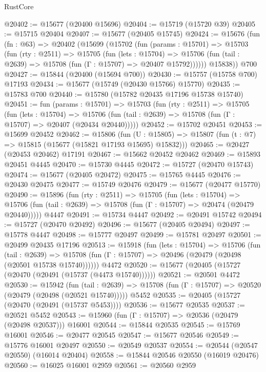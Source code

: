 \begin{lexlean}{RustCore}
\begin{coremodule}
@20402 := @15677 (@20400 @15696)
@20404 := @15719 (@15720 @39)
@20405 := @15715 @20404
@20407 := @15677 (@20405 @15745)
@20424 := @15676
    (fun (fn : @63) =>
    @20402
      (@15699
        (@15702
          (fun (params : @15701) =>
          @15703
            (fun (rty : @2511) =>
            @15705
              (fun (lets : @15704) =>
              @15706 (fun (tail : @2639) => @15708 (fun (Γ : @15707) => @20407 @15792))))))
        @15838))
    @700
@20427 := @15844 (@20400 (@15694 @700))
@20430 := @15757 (@15758 @700) @17193
@20434 := @15677 (@15749 (@20430 @15766) @15770)
@20435 := @15783 @700
@20440 := @15780 (@15782 @20435 @17196 @15738 @15740)
@20451 := fun (params : @15701) =>
  @15703
    (fun (rty : @2511) =>
    @15705
      (fun (lets : @15704) =>
      @15706 (fun (tail : @2639) => @15708 (fun (Γ : @15707) => @20407 (@20434 @20440)))))
@20452 := @15702 @20451
@20453 := @15699 @20452
@20462 := @15806
    (fun (U : @15805) => @15807 (fun (t : @7) => @15815 (@15677 (@15821 @17193 @15695) @15832)))
@20465 := @20427 (@20453 @20462) @17191
@20467 := @15662 @20452 @20462
@20469 := @15893 @20451 @4445
@20470 := @15730 @4445
@20472 := @15727 (@20470 @15743)
@20474 := @15677 (@20405 @20472)
@20475 := @15765 @4445
@20476 := @20430 @20475
@20477 := @15749 @20476
@20479 := @15677 (@20477 @15770)
@20490 := @15896
    (fun (rty : @2511) =>
    @15705
      (fun (lets : @15704) =>
      @15706 (fun (tail : @2639) => @15708 (fun (Γ : @15707) => @20474 (@20479 @20440)))))
    @4447
@20491 := @15734 @4447
@20492 := @20491 @15742
@20494 := @15727 (@20470 @20492)
@20496 := @15677 (@20405 @20494)
@20497 := @15778 @4447
@20498 := @15777 @20497
@20499 := @15781 @20497
@20501 := @20499 @20435 @17196
@20513 := @15918
    (fun (lets : @15704) =>
    @15706
      (fun (tail : @2639) =>
      @15708 (fun (Γ : @15707) => @20496 (@20479 (@20498 (@20501 @15738 @15740))))))
    @4472
@20520 := @15677 (@20405 (@15727 (@20470 (@20491 (@15737 (@4473 @15740))))))
@20521 := @20501 @4472
@20530 := @15942
    (fun (tail : @2639) => @15708 (fun (Γ : @15707) => @20520 (@20479 (@20498 (@20521 @15740)))))
    @5452
@20535 := @20405 (@15727 (@20470 (@20491 (@15737 @5453))))
@20536 := @15677 @20535
@20537 := @20521 @5452
@20543 := @15960 (fun (Γ : @15707) => @20536 (@20479 (@20498 @20537))) @16001
@20544 := @15844 @20535
@20545 := @15769 @16001
@20546 := @20477 @20545
@20547 := @15677 @20546
@20549 := @15776 @16001 @20497
@20550 := @20549 @20537
@20554 := @20544 (@20547 @20550) (@16014 @20404)
@20558 := @15844 @20546 @20550 (@16019 @20476)
@20560 := @16025 @16001 @2959
@20561 := @20560 @2959

\end{coremodule}
\end{lexlean}
